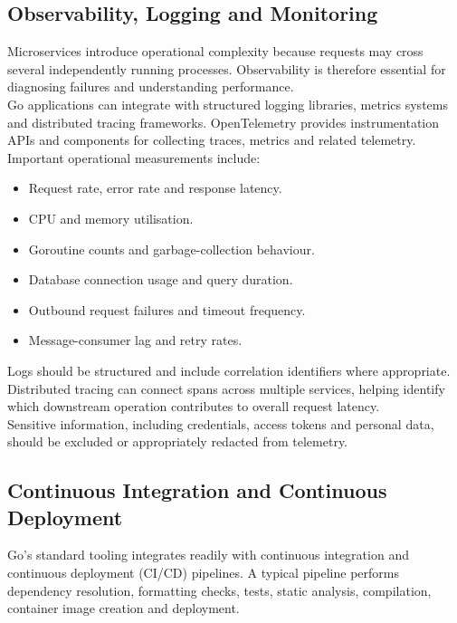 \subsection{Observability, Logging and Monitoring}

Microservices introduce operational complexity because requests may cross several independently running processes. Observability is therefore essential for diagnosing failures and understanding performance.\\

Go applications can integrate with structured logging libraries, metrics systems and distributed tracing frameworks. OpenTelemetry provides instrumentation APIs and components for collecting traces, metrics and related telemetry.\\

Important operational measurements include:

\begin{itemize}
    \item Request rate, error rate and response latency.
    \item CPU and memory utilisation.
    \item Goroutine counts and garbage-collection behaviour.
    \item Database connection usage and query duration.
    \item Outbound request failures and timeout frequency.
    \item Message-consumer lag and retry rates.
\end{itemize}

Logs should be structured and include correlation identifiers where appropriate. Distributed tracing can connect spans across multiple services, helping identify which downstream operation contributes to overall request latency.\\

Sensitive information, including credentials, access tokens and personal data, should be excluded or appropriately redacted from telemetry.

\subsection{Continuous Integration and Continuous Deployment}

Go's standard tooling integrates readily with continuous integration and continuous deployment (CI/CD) pipelines. A typical pipeline performs dependency resolution, formatting checks, tests, static analysis, compilation, container image creation and deployment.


